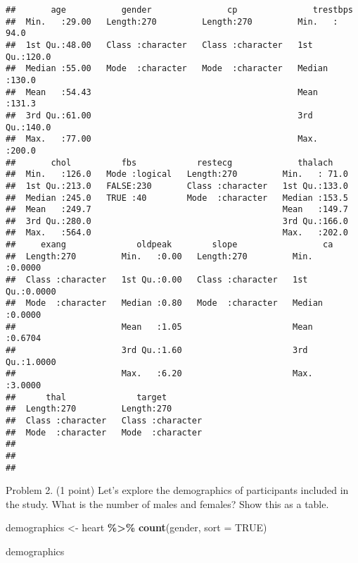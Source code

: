 \documentclass[
]{article}
\newenvironment{Shaded}{\begin{snugshade}}{\end{snugshade}}
\newcommand{\AttributeTok}[1]{\textcolor[rgb]{0.13,0.29,0.53}{#1}}
\newcommand{\ConstantTok}[1]{\textcolor[rgb]{0.56,0.35,0.01}{#1}}
\newcommand{\FunctionTok}[1]{\textcolor[rgb]{0.13,0.29,0.53}{\textbf{#1}}}
\newcommand{\NormalTok}[1]{#1}
\newcommand{\OtherTok}[1]{\textcolor[rgb]{0.56,0.35,0.01}{#1}}
\newcommand{\SpecialCharTok}[1]{\textcolor[rgb]{0.81,0.36,0.00}{\textbf{#1}}}
\begin{document}
\begin{verbatim}
##       age           gender               cp               trestbps    
##  Min.   :29.00   Length:270         Length:270         Min.   : 94.0  
##  1st Qu.:48.00   Class :character   Class :character   1st Qu.:120.0  
##  Median :55.00   Mode  :character   Mode  :character   Median :130.0  
##  Mean   :54.43                                         Mean   :131.3  
##  3rd Qu.:61.00                                         3rd Qu.:140.0  
##  Max.   :77.00                                         Max.   :200.0  
##       chol          fbs            restecg             thalach     
##  Min.   :126.0   Mode :logical   Length:270         Min.   : 71.0  
##  1st Qu.:213.0   FALSE:230       Class :character   1st Qu.:133.0  
##  Median :245.0   TRUE :40        Mode  :character   Median :153.5  
##  Mean   :249.7                                      Mean   :149.7  
##  3rd Qu.:280.0                                      3rd Qu.:166.0  
##  Max.   :564.0                                      Max.   :202.0  
##     exang              oldpeak        slope                 ca        
##  Length:270         Min.   :0.00   Length:270         Min.   :0.0000  
##  Class :character   1st Qu.:0.00   Class :character   1st Qu.:0.0000  
##  Mode  :character   Median :0.80   Mode  :character   Median :0.0000  
##                     Mean   :1.05                      Mean   :0.6704  
##                     3rd Qu.:1.60                      3rd Qu.:1.0000  
##                     Max.   :6.20                      Max.   :3.0000  
##      thal              target         
##  Length:270         Length:270        
##  Class :character   Class :character  
##  Mode  :character   Mode  :character  
##                                       
##                                       
## 
\end{verbatim}

Problem 2. (1 point) Let's explore the demographics of participants
included in the study. What is the number of males and females? Show
this as a table.

\begin{Shaded}
\begin{Highlighting}[]
\NormalTok{demographics }\OtherTok{\textless{}{-}}\NormalTok{ heart }\SpecialCharTok{\%\textgreater{}\%}
  \FunctionTok{count}\NormalTok{(gender, }\AttributeTok{sort =} \ConstantTok{TRUE}\NormalTok{)}

\NormalTok{demographics}
\end{Highlighting}
\end{Shaded}
\end{document}
